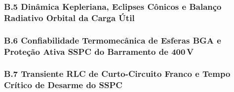 \vspace{0.6cm}
\subsubsection*{B.5 Dinâmica Kepleriana, Eclipses Cônicos e Balanço Radiativo Orbital da Carga Útil}


\vspace{0.6cm}
\subsubsection*{B.6 Confiabilidade Termomecânica de Esferas BGA e Proteção Ativa SSPC do Barramento de 400\,V}


\vspace{0.6cm}
\subsubsection*{B.7 Transiente RLC de Curto-Circuito Franco e Tempo Crítico de Desarme do SSPC}

